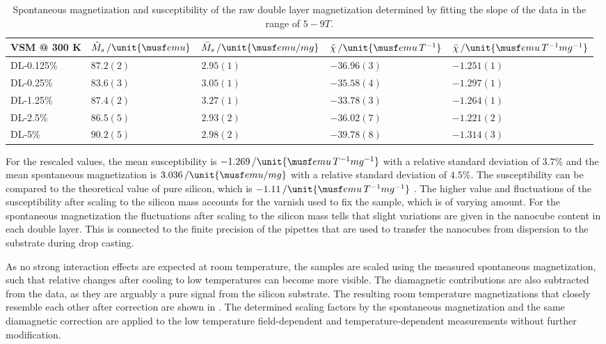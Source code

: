 \documentclass[\main/dresen_thesis.tex]{subfiles}
\begin{document}
    \begin{table}[!htbp]
      \centering
      \caption{\label{tab:doubleLayers:RTVSM:parameters} Spontaneous magnetization and susceptibility of the raw double layer magnetization determined by fitting the slope of the data in the range of $5 - 9 \unit{T}$.}
      \begin{tabular}{ l | l | l | l | l}
        \rule{0pt}{2ex} \textbf{VSM @ 300 K}  & $\tilde{M}_s \, / \unit{\musf emu}$ & $\bar{M}_s \, / \unit{\musf emu / mg}$ & $\tilde{\chi} \, / \unit{\musf emu \, T ^{-1}}$ & $\bar{\chi} \, / \unit{\musf emu \, T ^{-1} mg^{-1}}$ \\
        \hline
        \rule{0pt}{2ex} DL-0.125\%   & $87.2(2)$   & $2.95(1)$   & $-36.96(3)$ & $-1.251(1)$\\
        \rule{0pt}{2ex} DL-0.25\%    & $83.6(3)$   & $3.05(1)$   & $-35.58(4)$ & $-1.297(1)$\\
        \rule{0pt}{2ex} DL-1.25\%    & $87.4(2)$   & $3.27(1)$   & $-33.78(3)$ & $-1.264(1)$\\
        \rule{0pt}{2ex} DL-2.5\%     & $86.5(5)$   & $2.93(2)$   & $-36.02(7)$ & $-1.221(2)$\\
        \rule{0pt}{2ex} DL-5\%       & $90.2(5)$   & $2.98(2)$   & $-39.78(8)$ & $-1.314(3)$\\
        \hline
      \end{tabular}
    \end{table}

    For the rescaled values, the mean susceptibility is $-1.269\, / \unit{\musf emu \, T ^{-1} mg^{-1}}$ with a relative standard deviation of $3.7 \%$  and the mean spontaneous magnetization is $3.036 \, / \unit{\musf emu / mg}$ with a relative standard deviation of $4.5 \%$.
    The susceptibility can be compared to the theoretical value of pure silicon, which is $-1.11\, / \unit{\musf emu \, T ^{-1} mg^{-1}}$ \cite{Lide_2004_Handb}.
    The higher value and fluctuations of the susceptibility after scaling to the silicon mass accounts for the varnish used to fix the sample, which is of varying amount.
    For the spontaneous magnetization the fluctuations after scaling to the silicon mass tells that slight variations are given in the nanocube content in each double layer.
    This is connected to the finite precision of the pipettes that are used to transfer the nanocubes from dispersion to the substrate during drop casting.

    As no strong interaction effects are expected at room temperature, the samples are scaled using the measured spontaneous magnetization, such that relative changes after cooling to low temperatures can become more visible.
    The diamagnetic contributions are also subtracted from the data, as they are arguably a pure signal from the silicon substrate.
    The resulting room temperature magnetizations that closely resemble each other after correction are shown in .
    The determined scaling factors by the spontaneous magnetization and the same diamagnetic correction are applied to the low temperature field-dependent and temperature-dependent measurements without further modification.
\end{document}
